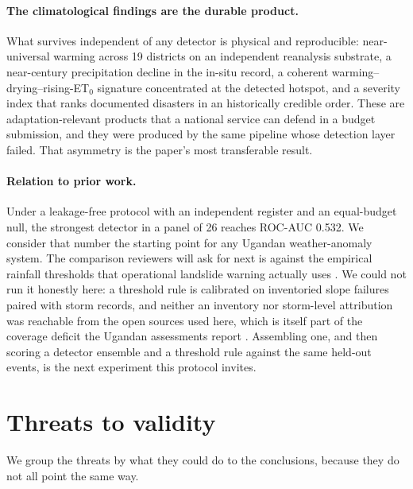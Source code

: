 \documentclass[preprint,12pt]{elsarticle}
\begin{document}
\paragraph{The climatological findings are the durable product.} What survives
independent of any detector is physical and reproducible: near-universal warming
across 19 districts on an independent reanalysis substrate, a near-century
precipitation decline in the in-situ record, a coherent
warming--drying--rising-ET$_0$ signature concentrated at the detected hotspot, and
a severity index that ranks documented disasters in an historically credible
order. These are adaptation-relevant products that a national service can defend
in a budget submission, and they were produced by the same pipeline whose
detection layer failed. That asymmetry is the paper's most transferable result.

\paragraph{Relation to prior work.} Under a leakage-free protocol with an
independent register and an equal-budget null, the strongest detector in a panel
of 26 reaches ROC-AUC 0.532. We consider that number the starting point for any
Ugandan weather-anomaly system. The comparison reviewers will ask for next is
against the empirical rainfall thresholds that operational landslide warning
actually uses \cite{guzzetti2020}. We could not run it honestly here: a
threshold rule is calibrated on inventoried slope failures paired with storm
records, and neither an inventory nor storm-level attribution was reachable
from the open sources used here, which is itself part of the coverage deficit
the Ugandan assessments report \cite{namwano2024,namwano2026}. Assembling one,
and then scoring a detector ensemble and a threshold rule against the same
held-out events, is the next experiment this protocol invites.

\section{Threats to validity}\label{sec:threats}
We group the threats by what they could do to the conclusions, because they do not
all point the same way.
\end{document}
